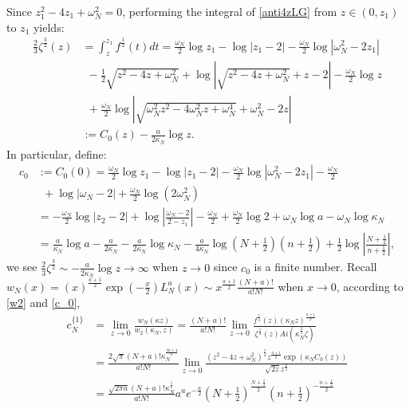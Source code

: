 \documentclass[11pt]{article}
\numberwithin{equation}{section}%
\numberwithin{theorem}{section}
\begin{document}
Since $z_1^2-4z_1+\omega_N^2=0$, performing the integral of \eqref{anti4zLG} from $z\in(0,z_1)$ to $z_1$ yields:
\begin{equation}\label{ex4zeta1}
    \begin{split}
        \frac{2}{3}\zeta^\frac{3}{2}(z)&=\int_z^{z_1}f^\frac{1}{2}(t)dt=\frac{\omega_N}{2}\log z_1-\log|z_1-2|-\frac{\omega_N}{2}\log|\omega_N^2-2z_1|\\
        &~~-\frac{1}{2}\sqrt{z^2-4z+\omega_N^2}+\log\left|\sqrt{z^2-4z+\omega_N^2}+z-2\right|-\frac{\omega_N}{2}\log z\\
        &~~+\frac{\omega_N}{2}\log\left|\sqrt{\omega_N^2z^2-4\omega_N^2z+\omega_N^4}+\omega_N^2-2z\right|\\&:=C_0(z)-\frac{a}{2\kappa_N}\log z.
    \end{split}
\end{equation}
In particular, define:
\begin{equation}\label{c_0}
    \begin{split}
       c_0&:=C_0(0)=\frac{\omega_N}{2}\log z_1-\log|z_1-2|-\frac{\omega_N}{2}\log|\omega_N^2-2z_1|-\frac{\omega_N}{2}\\&~~+\log|\omega_N-2|+\frac{\omega_N}{2}\log\left(2\omega_N^2\right)\\
       &=-\frac{\omega_N}{2}\log\left|z_2-2\right|+\log\left|\frac{\omega_N-2}{2-z_1}\right|-\frac{\omega_N}{2}+\frac{\omega_N}{2}\log2+\omega_N\log a-\omega_N\log\kappa_N\\&=\frac{a}{\kappa_N}\log a-\frac{a}{2\kappa_N}-\frac{a}{2\kappa_N}\log\kappa_N-\frac{a}{4\kappa_N}\log\left(N+\frac{1}{2}\right)\left(n+\frac{1}{2}\right)+\frac{1}{2}\log\left|\frac{N+\frac{1}{2}}{n+\frac{1}{2}}\right|,
    \end{split}
\end{equation}
we see $\frac{2}{3}\zeta^\frac{3}{2}\sim-\frac{a}{2\kappa_N}\log z\rightarrow\infty$ when $z\rightarrow0$ since $c_0$ is a finite number. Recall $w_N(x)=(x)^\frac{a+1}{2}\exp\left(-\frac{x}{2}\right)L_N^a(x)\sim x^\frac{a+1}{2}\frac{(N+a)!}{a!N!}$ when $x\rightarrow 0$, according to \eqref{w2} and \eqref{c_0},
\begin{equation}\label{conCN}
    \begin{split}
        c^{\{1\}}_N&=\lim_{z\rightarrow0}\frac{w_N(\kappa z)}{w_2(\kappa_N,z)}=\frac{(N+a)!}{a!N!}\lim_{z\rightarrow0}\frac{f^\frac{1}{4}(z)(\kappa_Nz)^\frac{a+1}{2}}{\zeta^\frac{1}{4}(z)Ai\left(\kappa_N^\frac{2}{3}\zeta\right)}\\
        &=\frac{2\sqrt{\pi}(N+a)!\kappa_N^\frac{3a+4}{6}}{a!N!}\lim_{z\rightarrow0}\frac{(z^2-4z+\omega_N^2)^\frac{1}{4}z^\frac{a+1}{2}\exp\left(\kappa_NC_0(z)\right)}{\sqrt{2z}z^{\frac{a}{2}}}\\
        &=\frac{\sqrt{2\pi a}(N+a)!\kappa_N^\frac{1}{6}}{a!N!}a^ae^{-\frac{a}{2}}\left(N+\frac{1}{2}\right)^{\frac{N+\frac{1}{2}}{2}}\left(n+\frac{1}{2}\right)^{-\frac{n+\frac{1}{2}}{2}}
    \end{split}
\end{equation}
\end{document}
